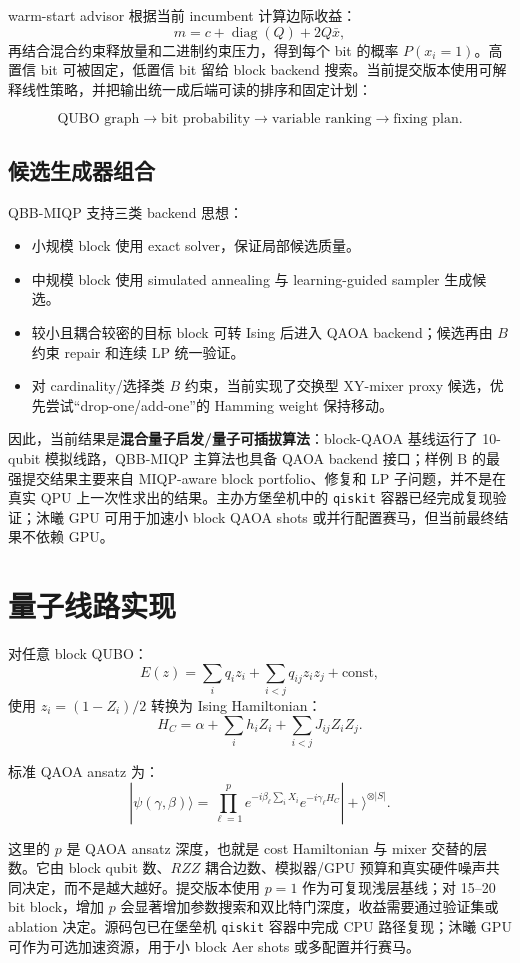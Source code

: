 \documentclass[UTF8,a4paper,11pt]{ctexart}
\begin{document}
warm-start advisor 根据当前 incumbent 计算边际收益：
\[
m=c+\operatorname{diag}(Q)+2Q\bar{x},
\]
再结合混合约束释放量和二进制约束压力，得到每个 bit 的概率 $P(x_i=1)$。高置信 bit 可被固定，低置信 bit 留给 block backend 搜索。当前提交版本使用可解释线性策略，并把输出统一成后端可读的排序和固定计划：

\[
\text{QUBO graph}\rightarrow \text{bit probability}\rightarrow
\text{variable ranking}\rightarrow \text{fixing plan}.
\]

\subsection{候选生成器组合}

QBB-MIQP 支持三类 backend 思想：

\begin{itemize}
  \item 小规模 block 使用 exact solver，保证局部候选质量。
  \item 中规模 block 使用 simulated annealing 与 learning-guided sampler 生成候选。
  \item 较小且耦合较密的目标 block 可转 Ising 后进入 QAOA backend；候选再由 $B$ 约束 repair 和连续 LP 统一验证。
  \item 对 cardinality/选择类 $B$ 约束，当前实现了交换型 XY-mixer proxy 候选，优先尝试“drop-one/add-one”的 Hamming weight 保持移动。
\end{itemize}

因此，当前结果是\textbf{混合量子启发/量子可插拔算法}：block-QAOA 基线运行了 10-qubit 模拟线路，QBB-MIQP 主算法也具备 QAOA backend 接口；样例 B 的最强提交结果主要来自 MIQP-aware block portfolio、修复和 LP 子问题，并不是在真实 QPU 上一次性求出的结果。主办方堡垒机中的 \texttt{qiskit} 容器已经完成复现验证；沐曦 GPU 可用于加速小 block QAOA shots 或并行配置赛马，但当前最终结果不依赖 GPU。

\section{量子线路实现}

对任意 block QUBO：
\[
E(z)=\sum_i q_i z_i+\sum_{i<j} q_{ij}z_iz_j+\text{const},
\]
使用 $z_i=(1-Z_i)/2$ 转换为 Ising Hamiltonian：
\[
H_C=\alpha+\sum_i h_iZ_i+\sum_{i<j}J_{ij}Z_iZ_j.
\]

标准 QAOA ansatz 为：
\[
|\psi(\gamma,\beta)\rangle=
\prod_{\ell=1}^{p}e^{-i\beta_\ell\sum_i X_i}
e^{-i\gamma_\ell H_C}
|+\rangle^{\otimes |S|}.
\]

这里的 $p$ 是 QAOA ansatz 深度，也就是 cost Hamiltonian 与 mixer 交替的层数。它由 block qubit 数、$RZZ$ 耦合边数、模拟器/GPU 预算和真实硬件噪声共同决定，而不是越大越好。提交版本使用 $p=1$ 作为可复现浅层基线；对 15--20 bit block，增加 $p$ 会显著增加参数搜索和双比特门深度，收益需要通过验证集或 ablation 决定。源码包已在堡垒机 \texttt{qiskit} 容器中完成 CPU 路径复现；沐曦 GPU 可作为可选加速资源，用于小 block Aer shots 或多配置并行赛马。
\end{document}
